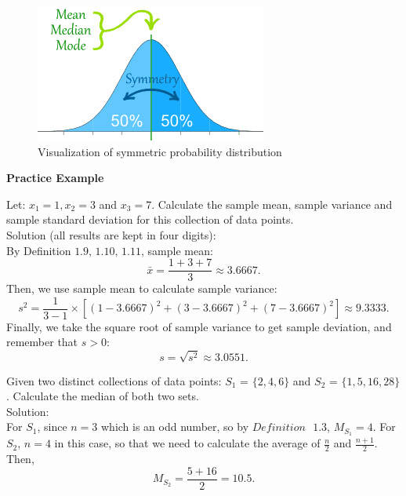 \begin{figure}[H]
 \centering
 \includegraphics[scale=0.75]{Section1/img/Symmetry.jpg}
 \caption{Visualization of symmetric probability distribution}
\end{figure}

\noindent
\textbf{Practice Example}

\begin{example}
Let: $x_1 = 1, x_2 = 3$ and $x_3 = 7$. Calculate the sample mean, sample variance and sample standard deviation for this collection of data points.\\
Solution (all results are kept in four digits):\\
By Definition $1.9 \text{, } 1.10 \text{, } 1.11$, sample mean: \[ \bar{x} = \frac{1+3+7}{3} \approx 3.6667.\]
Then, we use sample mean to calculate sample variance: \[ s^2 = \frac{1}{3-1} \times [(1-3.6667)^2+(3-3.6667)^2+(7-3.6667)^2] \approx 9.3333.\]
Finally, we take the square root of sample variance to get sample deviation, and remember that $s > 0$: \[ s = \sqrt{s^2} \approx 3.0551.\]
\end{example}

\begin{example}
Given two distinct collections of data points: $S_1$ = $\{2, 4, 6\}$ and $S_2$ = $\{1, 5, 16, 28\}$. Calculate the median of both two sets.\\
Solution: \\
For $S_1$, since $n = 3$ which is an odd number, so by $Definition \text{ } 1.3$, $M_{S_1} = 4$. For $S_2$, $n = 4$ in this case, so that we need to calculate the average of $\frac{n}{2}$ and $\frac{n+1}{2}$. Then, \[ M_{S_2} = \frac{5+16}{2} = 10.5.\]
\end{example}

